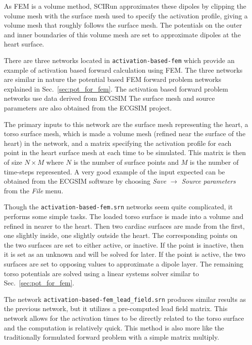 As FEM is a volume method, SCIRun approximates these dipoles by
clipping the volume mesh with the surface mesh used to specify the
activation profile, giving a volume mesh that roughly follows the
surface mesh. The potentials on the outer and inner boundaries of this
volume mesh are set to approximate dipoles at the heart surface.

There are three networks located in {\tt   activation-based-fem} 
which provide an example of activation based forward calculation 
using FEM.   The three networks are similar in nature the potential
 based FEM forward problem networks explained in Sec.~\ref{sec:pot_for_fem}.
 The activation based forward problem networks use data derived from ECGSIM
  The surface mesh and source
parameters are also obtained from the ECGSIM project.

The primary inputs to this network are the surface mesh representing
the heart, a torso surface mesh, which is made a volume mesh 
(refined near the surface of the heart) in the network, and
a matrix specifying the activation profile for each point in the heart
surface mesh at each time to be simulated. This matrix is then of size
$N \times M$ where $N$ is the number of surface points and $M$ is the
number of time-steps represented. A very good example of the input
expected can be obtained from the ECGSIM software by choosing {\em
  Save $\rightarrow$ Source parameters} from the {\em File} menu.
  
Though the {\tt activation-based-fem.srn} networks seem quite complicated, it performs some simple tasks.  The loaded torso surface is made into a volume and refined in nearer to the heart.  Then two cardiac surfaces are made from the first, one slightly inside, one slightly outside the heart.  The corresponding points on the two surfaces are set to either active, or inactive.  If the point is inactive, then it is set as an unknown and will be solved for later.  If the point is active, the two surfaces are set to opposing values to approximate a dipole layer.  The remaining torso potentials are solved using a linear systems solver similar to Sec.~\ref{sec:pot_for_fem}.
  
The network {\tt activation-based-fem\_lead\_field.srn} produces similar results as the previous network, but it utilizes a pre-computed lead field matrix.  This network allows for the activation times to be directly related to the torso surface and the computation is relatively quick.  This method is also more like the traditionally formulated forward problem with a simple matrix multiply.

